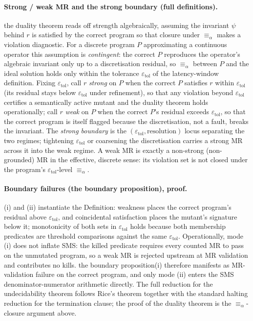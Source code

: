 \documentclass[manuscript,screen,review]{acmart}
\begin{document}
\paragraph{Strong / weak MR and the strong boundary (full definitions).}
the duality theorem reads off strength algebraically, assuming the
invariant $\psi$ behind $r$ is satisfied by the correct program so that closure
under $\equiv_\alpha$ makes a violation diagnostic. For a discrete program $P$
approximating a continuous operator this assumption is \emph{contingent}: the
correct $P$ reproduces the operator's algebraic invariant only up to a
discretisation residual, so $\equiv_\alpha$ between $P$ and the ideal solution
holds only within the tolerance $\varepsilon_{\mathrm{tol}}$ of the
latency-window definition. Fixing $\varepsilon_{\mathrm{tol}}$, call $r$
\emph{strong} on $P$ when the correct $P$ satisfies $r$ within
$\varepsilon_{\mathrm{tol}}$ (its residual stays below $\varepsilon_{\mathrm{tol}}$
under refinement), so that any violation beyond $\varepsilon_{\mathrm{tol}}$
certifies a semantically active mutant and the duality theorem holds
operationally; call $r$ \emph{weak} on $P$ when the correct $P$'s residual
exceeds $\varepsilon_{\mathrm{tol}}$, so that the correct program is itself
flagged because the discretisation, not a fault, breaks the invariant. The
\emph{strong boundary} is the $(\varepsilon_{\mathrm{tol}}, \text{resolution})$
locus separating the two regimes; tightening $\varepsilon_{\mathrm{tol}}$ or
coarsening the discretisation carries a strong MR across it into the weak regime.
A weak MR is exactly a non-strong (non-grounded) MR in the effective, discrete
sense: its violation set is not closed under the program's
$\varepsilon_{\mathrm{tol}}$-level $\equiv_\alpha$.

\paragraph{Boundary failures (the boundary proposition), proof.}
(i) and (ii) instantiate the Definition: weakness places the correct program's
residual above $\varepsilon_{\mathrm{tol}}$, and coincidental satisfaction places
the mutant's signature below it; monotonicity of both sets in
$\varepsilon_{\mathrm{tol}}$ holds because both membership predicates are
threshold comparisons against the same $\varepsilon_{\mathrm{tol}}$. Operationally,
mode (i) does not inflate SMS: the killed predicate requires every counted MR to
pass on the unmutated program, so a weak MR is rejected upstream at MR validation
and contributes no kills. the boundary proposition(i) therefore manifests
as MR-validation failure on the correct program, and only mode (ii) enters the
SMS denominator-numerator arithmetic directly. The full reduction for
the undecidability theorem follows Rice's theorem together with the standard
halting reduction for the termination clause; the proof of
the duality theorem is the $\equiv_\alpha$-closure argument above.
\end{document}
